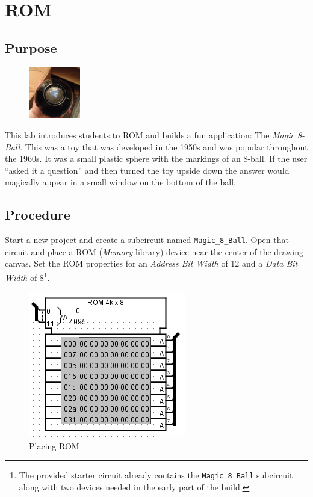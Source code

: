 \chapter{ROM}\label{Lab09}

\section{Purpose}

\begin{figure}
	\caption*{} %
	\label{fig:09-01} 
	\centering
	\includegraphics[width=0.2\textwidth]{gfx/09-01} 
\end{figure}
This lab introduces students to \acf{ROM} and builds a fun application: The \textit{Magic 8-Ball}. This was a toy that was developed in the 1950s and was popular throughout the 1960s. It was a small plastic sphere with the markings of an 8-ball. If the user ``asked it a question'' and then turned the toy upside down the answer would magically appear in a small window on the bottom of the ball.

\section{Procedure}

Start a new \LE project and create a subcircuit named \lstinline[columns=fixed]|Magic_8_Ball|. Open that circuit and place a ROM (\textit{Memory} library) device near the center of the drawing canvas. Set the ROM properties for an \textit{Address Bit Width} of 12 and a \textit{Data Bit Width} of 8\footnote{The provided starter circuit already contains the \lstinline[columns=fixed]|Magic_8_Ball| subcircuit along with two devices needed in the early part of the build.}.

\begin{figure}[H]
	\centering
	\includegraphics[width=\maxwidth{.95\linewidth}]{gfx/09-02}
	\caption{Placing ROM}
	\label{fig:09-02}
\end{figure}

